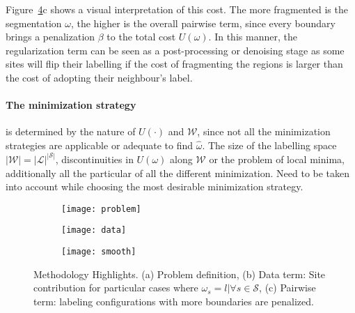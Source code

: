 Figure~\ref{fig:methodTerms}c shows a visual interpretation of this cost.
The more fragmented is the segmentation $\omega$, the higher is the overall pairwise term, since every boundary brings a penalization $\beta$ to the total cost $U(\omega)$.
In this manner, the regularization term can be seen as a post-processing or denoising stage as some sites will flip their labelling if the cost of fragmenting the regions is larger than the cost of adopting their neighbour's label.


\paragraph{The minimization strategy} \label{sec:method:min}
is determined by the nature of $U(\cdot)$ and $\mathcal{W}$, since not all the minimization strategies are applicable or adequate to find $\hat{\omega}$.
The size of the labelling space $|\mathcal{W}|=|\mathcal{L}|^{|\mathcal{S}|}$, discontinuities in $U(\omega)$ along $\mathcal{W}$ or the problem of local minima,
additionally all the particular of all the different minimization.
Need to be taken into account while choosing the most desirable minimization strategy.

\begin{figure}[t]
    \centering
    \begin{subfigure}[b]{0.19\textwidth}
        \centering
        \texttt{[image: problem]}
        \label{fig:methodTerms:problem}
    \end{subfigure}
    \hfill
    \begin{subfigure}[b]{0.39\textwidth}
        \centering
        \texttt{[image: data]}
        \label{fig:methodTerms:data}
    \end{subfigure}
    \hfill
    \begin{subfigure}[b]{0.39\textwidth}
        \centering
        \texttt{[image: smooth]}
        \label{fig:methodTerms:boundary}
    \end{subfigure}
    \caption {\small Methodology Highlights. (a) Problem definition,
    (b) Data term: Site contribution for particular cases where $\omega_s=l|\forall s \in \mathcal{S}$,
    (c) Pairwise term: labeling configurations with more boundaries are penalized.}
    \label{fig:methodTerms}
\end{figure}

